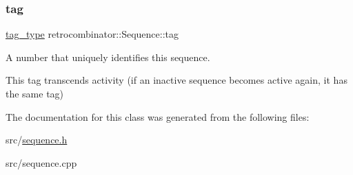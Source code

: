 \subsubsection{\texorpdfstring{tag}{tag}}
{\footnotesize\ttfamily \hyperlink{constants_8h_afd7c6eb4293e8c4d12827609a9a34b9b}{tag\+\_\+type} retrocombinator\+::\+Sequence\+::tag\hspace{0.3cm}{\ttfamily [private]}}



A number that uniquely identifies this sequence. 

This tag transcends activity (if an inactive sequence becomes active again, it has the same tag) 

The documentation for this class was generated from the following files\+:\begin{DoxyCompactItemize}
\item 
src/\hyperlink{sequence_8h}{sequence.\+h}\item 
src/sequence.\+cpp\end{DoxyCompactItemize}
